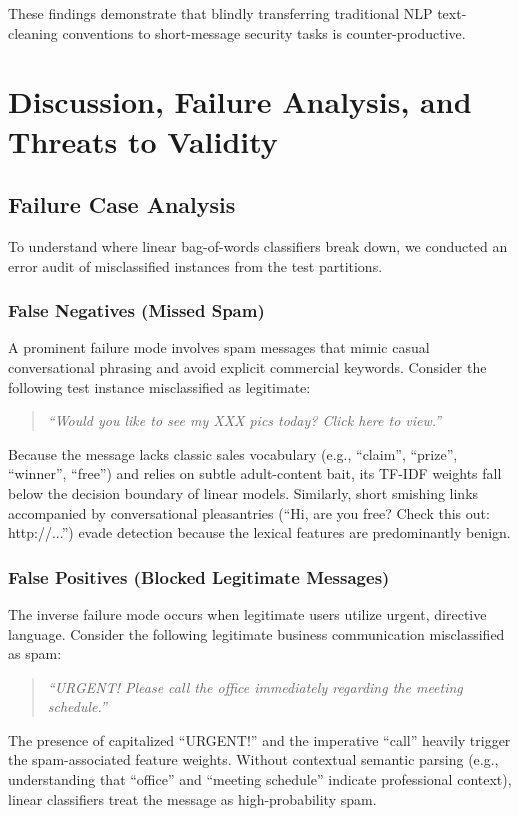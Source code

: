 \documentclass[conference]{IEEEtran}
\begin{document}
These findings demonstrate that blindly transferring traditional NLP text-cleaning conventions to short-message security tasks is counter-productive.

\section{Discussion, Failure Analysis, and Threats to Validity}

\subsection{Failure Case Analysis}
To understand where linear bag-of-words classifiers break down, we conducted an error audit of misclassified instances from the test partitions.

\subsubsection{False Negatives (Missed Spam)}
A prominent failure mode involves spam messages that mimic casual conversational phrasing and avoid explicit commercial keywords. Consider the following test instance misclassified as legitimate:
\begin{quote}
\textit{``Would you like to see my XXX pics today? Click here to view.''}
\end{quote}
Because the message lacks classic sales vocabulary (e.g., ``claim'', ``prize'', ``winner'', ``free'') and relies on subtle adult-content bait, its TF-IDF weights fall below the decision boundary of linear models. Similarly, short smishing links accompanied by conversational pleasantries (``Hi, are you free? Check this out: http://...'') evade detection because the lexical features are predominantly benign.

\subsubsection{False Positives (Blocked Legitimate Messages)}
The inverse failure mode occurs when legitimate users utilize urgent, directive language. Consider the following legitimate business communication misclassified as spam:
\begin{quote}
\textit{``URGENT! Please call the office immediately regarding the meeting schedule.''}
\end{quote}
The presence of capitalized ``URGENT!'' and the imperative ``call'' heavily trigger the spam-associated feature weights. Without contextual semantic parsing (e.g., understanding that ``office'' and ``meeting schedule'' indicate professional context), linear classifiers treat the message as high-probability spam.
\end{document}
